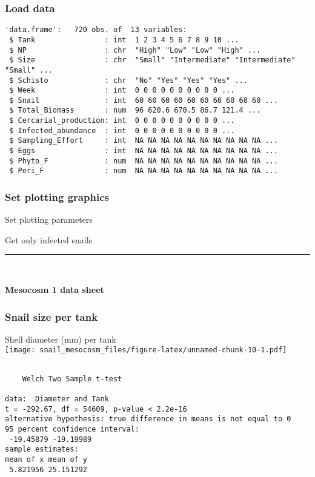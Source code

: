 \documentclass[10,portrait]{article}
\begin{document}
\subsubsection{Load data}\label{load-data}

\begin{verbatim}
'data.frame':   720 obs. of  13 variables:
 $ Tank                : int  1 2 3 4 5 6 7 8 9 10 ...
 $ NP                  : chr  "High" "Low" "Low" "High" ...
 $ Size                : chr  "Small" "Intermediate" "Intermediate" "Small" ...
 $ Schisto             : chr  "No" "Yes" "Yes" "Yes" ...
 $ Week                : int  0 0 0 0 0 0 0 0 0 0 ...
 $ Snail               : int  60 60 60 60 60 60 60 60 60 60 ...
 $ Total_Biomass       : num  96 620.6 670.5 86.7 121.4 ...
 $ Cercarial_production: int  0 0 0 0 0 0 0 0 0 0 ...
 $ Infected_abundance  : int  0 0 0 0 0 0 0 0 0 0 ...
 $ Sampling_Effort     : int  NA NA NA NA NA NA NA NA NA NA ...
 $ Eggs                : int  NA NA NA NA NA NA NA NA NA NA ...
 $ Phyto_F             : num  NA NA NA NA NA NA NA NA NA NA ...
 $ Peri_F              : num  NA NA NA NA NA NA NA NA NA NA ...
\end{verbatim}

\subsubsection{Set plotting graphics}\label{set-plotting-graphics}

Set plotting parameters

Get only infected snails

\begin{center}\rule{0.5\linewidth}{\linethickness}\end{center}

~

\textbf{Mesocosm 1 data sheet}

\subsubsection{Snail size per tank}\label{snail-size-per-tank}

Shell diameter (mm) per tank\\
\texttt{[image: snail\_mesocosm\_files/figure-latex/unnamed-chunk-10-1.pdf]}

\begin{verbatim}

    Welch Two Sample t-test

data:  Diameter and Tank
t = -292.67, df = 54609, p-value < 2.2e-16
alternative hypothesis: true difference in means is not equal to 0
95 percent confidence interval:
 -19.45879 -19.19989
sample estimates:
mean of x mean of y 
 5.821956 25.151292 
\end{verbatim}
\end{document}
